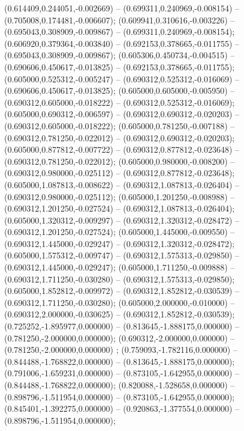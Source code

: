  (0.614409,0.244051,-0.002669) -- (0.699311,0.240969,-0.008154) -- (0.705008,0.174481,-0.006607);
 (0.609941,0.310616,-0.003226) -- (0.695043,0.308909,-0.009867) -- (0.699311,0.240969,-0.008154);
 (0.606920,0.379364,-0.003840) -- (0.692153,0.378665,-0.011755) -- (0.695043,0.308909,-0.009867);
 (0.605306,0.450734,-0.004515) -- (0.690606,0.450617,-0.013825) -- (0.692153,0.378665,-0.011755);
 (0.605000,0.525312,-0.005247) -- (0.690312,0.525312,-0.016069) -- (0.690606,0.450617,-0.013825);
 (0.605000,0.605000,-0.005950) -- (0.690312,0.605000,-0.018222) -- (0.690312,0.525312,-0.016069);
 (0.605000,0.690312,-0.006597) -- (0.690312,0.690312,-0.020203) -- (0.690312,0.605000,-0.018222);
 (0.605000,0.781250,-0.007188) -- (0.690312,0.781250,-0.022012) -- (0.690312,0.690312,-0.020203);
 (0.605000,0.877812,-0.007722) -- (0.690312,0.877812,-0.023648) -- (0.690312,0.781250,-0.022012);
 (0.605000,0.980000,-0.008200) -- (0.690312,0.980000,-0.025112) -- (0.690312,0.877812,-0.023648);
 (0.605000,1.087813,-0.008622) -- (0.690312,1.087813,-0.026404) -- (0.690312,0.980000,-0.025112);
 (0.605000,1.201250,-0.008988) -- (0.690312,1.201250,-0.027524) -- (0.690312,1.087813,-0.026404);
 (0.605000,1.320312,-0.009297) -- (0.690312,1.320312,-0.028472) -- (0.690312,1.201250,-0.027524);
 (0.605000,1.445000,-0.009550) -- (0.690312,1.445000,-0.029247) -- (0.690312,1.320312,-0.028472);
 (0.605000,1.575312,-0.009747) -- (0.690312,1.575313,-0.029850) -- (0.690312,1.445000,-0.029247);
 (0.605000,1.711250,-0.009888) -- (0.690312,1.711250,-0.030280) -- (0.690312,1.575313,-0.029850);
 (0.605000,1.852812,-0.009972) -- (0.690312,1.852812,-0.030539) -- (0.690312,1.711250,-0.030280);
 (0.605000,2.000000,-0.010000) -- (0.690312,2.000000,-0.030625) -- (0.690312,1.852812,-0.030539);
 (0.725252,-1.895977,0.000000) -- (0.813645,-1.888175,0.000000) -- (0.781250,-2.000000,0.000000);
 (0.690312,-2.000000,0.000000) -- (0.781250,-2.000000,0.000000) ;
 (0.759093,-1.782116,0.000000) -- (0.844488,-1.768822,0.000000) -- (0.813645,-1.888175,0.000000);
 (0.791006,-1.659231,0.000000) -- (0.873105,-1.642955,0.000000) -- (0.844488,-1.768822,0.000000);
 (0.820088,-1.528658,0.000000) -- (0.898796,-1.511954,0.000000) -- (0.873105,-1.642955,0.000000);
 (0.845401,-1.392275,0.000000) -- (0.920863,-1.377554,0.000000) -- (0.898796,-1.511954,0.000000);
